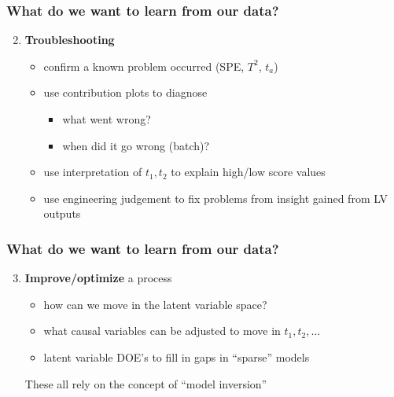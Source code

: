 \begin{frame}\frametitle{What do we want to learn from our data?}

\begin{enumerate}
	\setcounter{enumi}{1}
	\item {\bf \color{myGreen}Troubleshooting}
	\begin{itemize}
		\item 	confirm a known problem occurred (SPE, \( T^2 \), \( t_a \))
		\item 	use contribution plots to diagnose
		\begin{itemize}
			\item 	what went wrong?
			\item 	when did it go wrong (batch)? 
		\end{itemize}\pause
		
		\item 	use interpretation of \( t_1, t_2 \) to explain high/low score values\pause
		\item 	use engineering judgement to fix problems from insight gained from LV outputs
	\end{itemize}
\end{enumerate}
\end{frame}
	
\begin{frame}\frametitle{What do we want to learn from our data?}

\begin{enumerate}
	\setcounter{enumi}{2}
	
	\item {\bf \color{myGreen}Improve/optimize} a process
	
	\begin{itemize}
		\item 	how can we move in the latent variable space?
		
		\item 	what causal variables can be adjusted to move in \( t_1, t_2, \ldots \)
		
		\item 	latent variable DOE's to fill in gaps in ``sparse'' models
	\end{itemize}	
	
	These all rely on the concept of \alert{``model inversion''}
	
\end{enumerate}
\end{frame}

